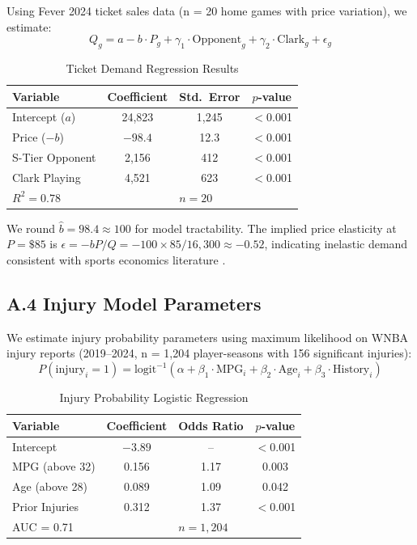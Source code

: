 \documentclass{mcmthesis}
\begin{document}
Using Fever 2024 ticket sales data (n = 20 home games with price variation), we estimate:
\begin{equation}
Q_g = a - b \cdot P_g + \gamma_1 \cdot \text{Opponent}_g + \gamma_2 \cdot \text{Clark}_g + \epsilon_g
\end{equation}

\begin{table}[H]
\centering
\caption{Ticket Demand Regression Results}
\small
\begin{tabular}{lccc}
\toprule
\textbf{Variable} & \textbf{Coefficient} & \textbf{Std.\ Error} & \textbf{$p$-value} \\
\midrule
Intercept ($a$) & 24,823 & 1,245 & $<$0.001 \\
Price ($-b$) & $-98.4$ & 12.3 & $<$0.001 \\
S-Tier Opponent & 2,156 & 412 & $<$0.001 \\
Clark Playing & 4,521 & 623 & $<$0.001 \\
\midrule
\multicolumn{2}{l}{$R^2 = 0.78$} & \multicolumn{2}{l}{$n = 20$} \\
\bottomrule
\end{tabular}
\end{table}

We round $\hat{b} = 98.4 \approx 100$ for model tractability. The implied price elasticity at $P = \$85$ is $\epsilon = -bP/Q = -100 \times 85 / 16{,}300 \approx -0.52$, indicating inelastic demand consistent with sports economics literature \cite{krautmann2007}.

\subsection*{A.4 Injury Model Parameters}

We estimate injury probability parameters using maximum likelihood on WNBA injury reports (2019--2024, n = 1,204 player-seasons with 156 significant injuries):
\begin{equation}
P(\text{injury}_i = 1) = \text{logit}^{-1}\left(\alpha + \beta_1 \cdot \text{MPG}_i + \beta_2 \cdot \text{Age}_i + \beta_3 \cdot \text{History}_i\right)
\end{equation}

\begin{table}[H]
\centering
\caption{Injury Probability Logistic Regression}
\small
\begin{tabular}{lccc}
\toprule
\textbf{Variable} & \textbf{Coefficient} & \textbf{Odds Ratio} & \textbf{$p$-value} \\
\midrule
Intercept & $-3.89$ & -- & $<$0.001 \\
MPG (above 32) & 0.156 & 1.17 & 0.003 \\
Age (above 28) & 0.089 & 1.09 & 0.042 \\
Prior Injuries & 0.312 & 1.37 & $<$0.001 \\
\midrule
\multicolumn{2}{l}{AUC = 0.71} & \multicolumn{2}{l}{$n = 1{,}204$} \\
\bottomrule
\end{tabular}
\end{table}
\end{document}
